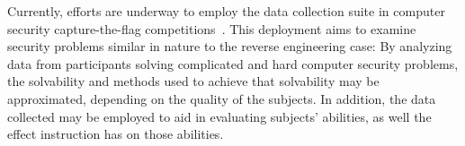 Currently, efforts are underway to employ the data collection suite in computer security capture-the-flag competitions~\cite{taylor2017ctf}.  This deployment aims to examine security problems similar in nature to the reverse engineering case:  By analyzing data from participants solving complicated and hard computer security problems, the solvability and methods used to achieve that solvability may be approximated, depending on the quality of the subjects.  In addition, the data collected may be employed to aid in evaluating subjects' abilities, as well the effect instruction has on those abilities.
